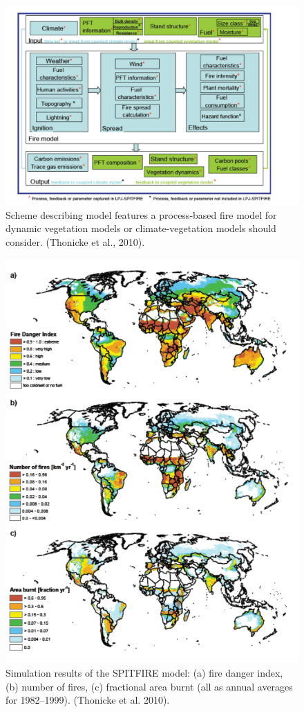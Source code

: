 \documentclass[
  12pt,
  oneside]{book}
\begin{document}
\begin{figure}

{\centering \includegraphics[width=0.8\linewidth]{figures/chap8/f85_spitfire} 

}

\caption{Scheme describing model features a process-based fire model for dynamic vegetation models or climate-vegetation models should consider. (Thonicke et al., 2010).}\label{fig:f85}
\end{figure}

\begin{figure}

{\centering \includegraphics[width=0.8\linewidth]{figures/chap8/f86_spitfire_output} 

}

\caption{Simulation results of the SPITFIRE model: (a) fire danger index, (b) number of fires, (c) fractional area burnt (all as annual averages for 1982–1999). (Thonicke et al. 2010).}\label{fig:f86}
\end{figure}
\end{document}
